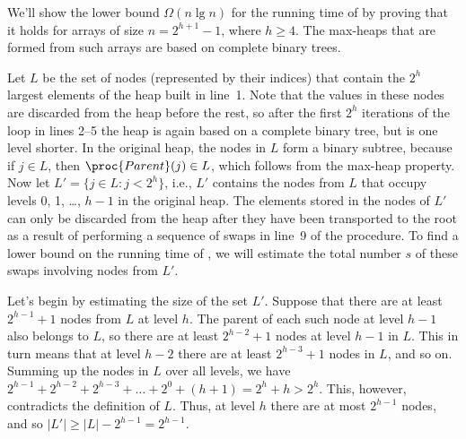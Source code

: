 \starred
We'll show the lower bound $\Omega(n\lg n)$ for the running time of  by proving that it holds for arrays of size $n=2^{h+1}-1$, where $h\ge4$.
The max-heaps that are formed from such arrays are based on complete binary trees.

Let $L$ be the set of nodes (represented by their indices) that contain the $2^h$ largest elements of the heap built in line~1.
Note that the values in these nodes are discarded from the heap before the rest, so after the first $2^h$ iterations of the  loop in lines 2--5 the heap is again based on a complete binary tree, but is one level shorter.
In the original heap, the nodes in $L$ form a binary subtree, because if $j\in L$, then $\proc{Parent}(j)\in L$, which follows from the max-heap property.
Now let $L'=\{j\in L:j<2^h\}$, i.e., $L'$ contains the nodes from $L$ that occupy levels 0, 1, \dots, $h-1$ in the original heap.
The elements stored in the nodes of $L'$ can only be discarded from the heap after they have been transported to the root as a result of performing a sequence of swaps in line~9 of the  procedure.
To find a lower bound on the running time of , we will estimate the total number $s$ of these swaps involving nodes from $L'$.

Let's begin by estimating the size of the set $L'$.
Suppose that there are at least $2^{h-1}+1$ nodes from $L$ at level $h$.
The parent of each such node at level $h-1$ also belongs to $L$, so there are at least $2^{h-2}+1$ nodes at level $h-1$ in $L$.
This in turn means that at level $h-2$ there are at least $2^{h-3}+1$ nodes in $L$, and so on.
Summing up the nodes in $L$ over all levels, we have $2^{h-1}+2^{h-2}+2^{h-3}+\dots+2^0+(h+1)=2^h+h>2^h$.
This, however, contradicts the definition of $L$.
Thus, at level $h$ there are at most $2^{h-1}$ nodes, and so $|L'|\ge|L|-2^{h-1}=2^{h-1}$.

